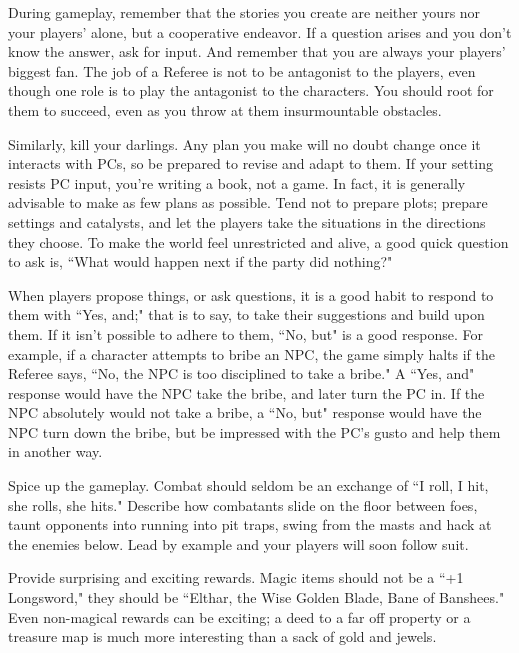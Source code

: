 \documentclass[twoside]{article}
\begin{document}
\bigbreak

During gameplay, remember that the stories you create are neither yours nor your players' alone, but a cooperative endeavor. If a question arises and you don't know the answer, ask for input. And remember that you are always your players' biggest fan. The job of a Referee is not to be antagonist to the players, even though one role is to play the antagonist to the characters. You should root for them to succeed, even as you throw at them insurmountable obstacles.

\bigbreak

Similarly, kill your darlings. Any plan you make will no doubt change once it interacts with PCs, so be prepared to revise and adapt to them. If your setting resists PC input, you're writing a book, not a game. In fact, it is generally advisable to make as few plans as possible. Tend not to prepare plots; prepare settings and catalysts, and let the players take the situations in the directions they choose. To make the world feel unrestricted and alive, a good quick question to ask is, ``What would happen next if the party did nothing?"

\bigbreak

When players propose things, or ask questions, it is a good habit to respond to them with ``Yes, and;" that is to say, to take their suggestions and build upon them. If it isn't possible to adhere to them, ``No, but" is a good response. For example, if a character attempts to bribe an NPC, the game simply halts if the Referee says, ``No, the NPC is too disciplined to take a bribe." A ``Yes, and" response would have the NPC take the bribe, and later turn the PC in. If the NPC absolutely would not take a bribe, a ``No, but" response would have the NPC turn down the bribe, but be impressed with the PC's gusto and help them in another way.

\bigbreak

Spice up the gameplay. Combat should seldom be an exchange of ``I roll, I hit, she rolls, she hits." Describe how combatants slide on the floor between foes, taunt opponents into running into pit traps, swing from the masts and hack at the enemies below. Lead by example and your players will soon follow suit.

\bigbreak

Provide surprising and exciting rewards. Magic items should not be a ``+1 Longsword," they should be ``Elthar, the Wise Golden Blade, Bane of Banshees." Even non-magical rewards can be exciting; a deed to a far off property or a treasure map is much more interesting than a sack of gold and jewels.
\end{document}
